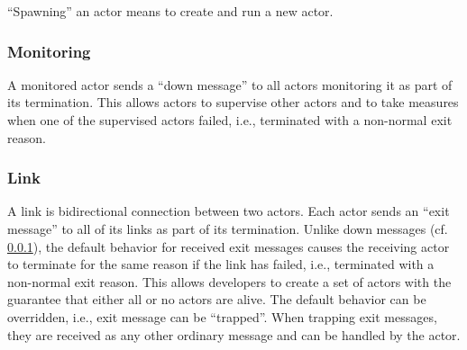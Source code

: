 ``Spawning'' an actor means to create and run a new actor.

\subsubsection{Monitoring}
\label{sec:monitoring}

A monitored actor sends a ``down message'' to all actors monitoring it as part of its termination.
This allows actors to supervise other actors and to take measures when one of the supervised actors failed, i.e., terminated with a non-normal exit reason.

\subsubsection{Link}

A link is bidirectional connection between two actors.
Each actor sends an ``exit message'' to all of its links as part of its termination.
Unlike down messages (cf. \ref{sec:monitoring}), the default behavior for received exit messages causes the receiving actor to terminate for the same reason if the link has failed, i.e., terminated with a non-normal exit reason.
This allows developers to create a set of actors with the guarantee that either all or no actors are alive.
The default behavior can be overridden, i.e., exit message can be ``trapped''.
When trapping exit messages, they are received as any other ordinary message and can be handled by the actor.
